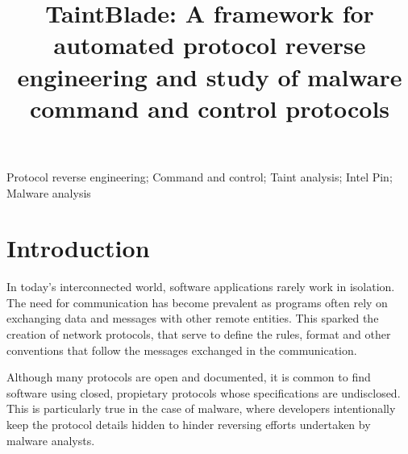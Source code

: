 \documentclass[conference]{IEEEtran}
\begin{document}
\title{TaintBlade: A framework for automated protocol reverse engineering and study of malware command and control protocols
}

\author{
    \and
}

\maketitle

\begin{abstract}
    
\end{abstract}

\begin{IEEEkeywords}
    Protocol reverse engineering; Command and control; Taint analysis; Intel Pin; Malware analysis 
\end{IEEEkeywords}

\section{Introduction}
In today's interconnected world, software applications rarely work in
isolation. The need for communication has become prevalent as programs often
rely on exchanging data and messages with other remote entities. This sparked
the creation of network protocols, that serve to define the rules, format and
other conventions that follow the messages exchanged in the communication.

Although many protocols are open and documented, it is common to find software
using closed, propietary protocols whose specifications are undisclosed. This
is particularly true in the case of malware, where developers intentionally
keep the protocol details hidden to hinder reversing efforts undertaken by
malware analysts.
\end{document}
